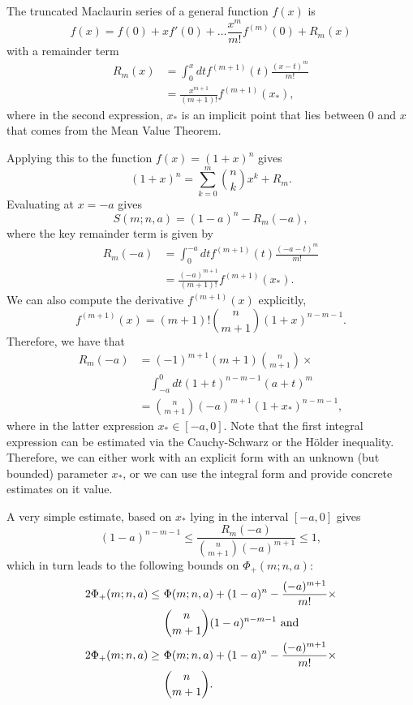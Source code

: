 \documentclass[pra,
aps,
twocolumn,
superscriptaddress,
groupedaddress,
nofootinbib,
reprint
]{revtex4-1}
\begin{document}
The truncated Maclaurin series of a general function $f(x)$ is
\begin{equation}
	f(x) = f(0) + x f'(0) + \dots \frac{x^m}{m!}f^{(m)}(0) + R_m(x)
\end{equation}
with a remainder term
\begin{align}
	R_m (x)&= \int_{0}^x dt f^{(m+1)}(t) \frac{(x-t)^m}{m!} \\
	&= \frac{x^{m+1}}{(m+1)!} f^{(m+1)}(x_*),
\end{align}
where in the second expression, $x_*$ is an implicit point that lies between $0$ and $x$ that comes from the Mean Value Theorem.

Applying this to the function $f(x) = (1+x)^n$ gives
\begin{equation}
	(1+x)^n = \sum_{k=0}^m \binom{n}{k} x^k + R_m.
\end{equation}
Evaluating at $x=-a$ gives
\begin{equation}
	S(m; n, a) = (1-a)^n - R_m(-a),
\end{equation}
where the key remainder term is given by
\begin{align}
	R_m(-a) &= \int_0^{-a} dt f^{(m+1)}(t) \frac{(-a-t)^m}{m!} \\
&= \frac{(-a)^{m+1}}{(m+1)!} f^{(m+1)}(x_*).
\end{align}
We can also compute the derivative $f^{(m+1)}(x)$ explicitly,
\begin{equation}
	f^{(m+1)}(x) = (m+1)!\binom{n}{m+1}(1+x)^{n-m-1}.
\end{equation}
Therefore, we have that
\begin{align}
	R_m(-a) &= (-1)^{m+1}(m+1)\binom{n}{m+1}\times \nonumber\\
	&\hspace{12pt} \int_{-a}^0 dt (1+t)^{n-m-1}(a+t)^m \\
&= \binom{n}{m+1}(-a)^{m+1}(1+x_*)^{n-m-1},
\end{align}
where in the latter expression $x_* \in [-a,0]$. 
Note that the first integral expression can be estimated via the Cauchy-Schwarz or the H{\"o}lder inequality. 
Therefore, we can either work with an explicit form with an unknown (but bounded) parameter $x_*$, or we can use the integral form and provide concrete estimates on it value.

A very simple estimate, based on $x_*$ lying in the interval $[-a,0]$ gives
\begin{equation}
(1-a)^{n-m-1} \leq \frac{R_m(-a)}{\binom{n}{m+1}(-a)^{m+1}} \leq 1,
\end{equation}
which in turn leads to the following bounds on $\Phi_+(m; n, a)$:
\begin{align}
	\hspace{-2cm}2\Phi_+(m; n, a) \leq\ &\Phi(m; n, a) + (1-a)^n - \frac{(-a)^{m+1}}{m!} \times \nonumber\\
	 &\binom{n}{m+1} (1-a)^{n-m-1} \text{ and} \\
	2\Phi_+(m; n, a) \geq\ &\Phi(m; n, a) + (1-a)^n - \frac{(-a)^{m+1}}{m!}  \times \nonumber\\
	 &\binom{n}{m+1} .
\end{align}
\end{document}
